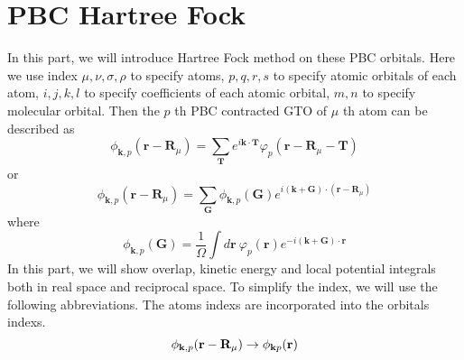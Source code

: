 \documentclass{article}
\begin{document}
\section{PBC Hartree Fock}
    In this part, we will introduce Hartree Fock method on these PBC orbitals.
    Here we use index $\mu,\nu,\sigma,\rho$ to specify atoms,
    $p,q,r,s$ to specify atomic orbitals of each atom,
    $i,j,k,l$ to specify coefficients of each atomic orbital,
    $m,n$ to specify molecular orbital.
    Then the $p$ th PBC contracted GTO of $\mu$ th atom can be described as
    \begin{equation}
        \phi_{\textbf{k},p}(\textbf{r}-\textbf{R}_{\mu}) = \sum_{\textbf{T}}e^{i\textbf{k}\cdot\textbf{T}}\varphi_p(\textbf{r}-\textbf{R}_{\mu}-\textbf{T})
    \end{equation}
    or 
    \begin{equation}
        \phi_{\textbf{k},p}(\textbf{r}-\textbf{R}_{\mu}) = \sum_{\textbf{G}}\phi_{\textbf{k},p}(\textbf{G})e^{i(\textbf{k}+\textbf{G})\cdot(\textbf{r}-\textbf{R}_{\mu})}
    \end{equation}
    where
    \begin{equation}
        \phi_{\textbf{k},p}(\textbf{G}) = \frac{1}{\Omega}\int d\textbf{r}\ \varphi_p(\textbf{r})e^{-i(\textbf{k}+\textbf{G})\cdot\textbf{r}}
    \end{equation}
    In this part, we will show overlap, kinetic energy and local potential integrals both in real space and reciprocal space.
    To simplify the index, we will use the following abbreviations. The atoms indexs are incorporated into the orbitals indexs.
    \begin{equation}
        \phi_{\textbf{k},p}(\textbf{r}-\textbf{R}_{\mu}) \rightarrow \phi_{\textbf{k}p}(\textbf{r}) \notag
    \end{equation}

\end{document}
